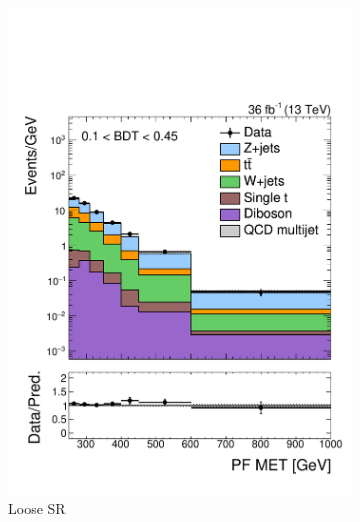 \begin{figure}[]
    \begin{center}
        \begin{subfigure}[t]{0.49\textwidth}
            \includegraphics[width=\textwidth]{figures/monotop/prefit/signal_loose_pfmet_logy.pdf}
            \caption{Loose SR}
        \end{subfigure}
        \begin{subfigure}[t]{0.49\textwidth}

\end{subfigure}
\end{center}
\end{figure}
